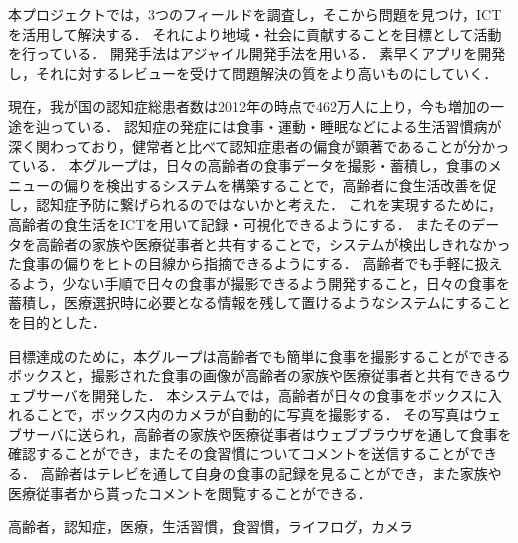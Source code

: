 \documentclass[../report]{subfiles}
\begin{document}
\begin{jabstract}
本プロジェクトでは，3つのフィールドを調査し，そこから問題を見つけ，ICTを活用して解決する．
それにより地域・社会に貢献することを目標として活動を行っている．
開発手法はアジャイル開発手法を用いる．
素早くアプリを開発し，それに対するレビューを受けて問題解決の質をより高いものにしていく．

現在，我が国の認知症総患者数は2012年の時点で462万人に上り，今も増加の一途を辿っている．
認知症の発症には食事・運動・睡眠などによる生活習慣病が深く関わっており，健常者と比べて認知症患者の偏食が顕著であることが分かっている．
本グループは，日々の高齢者の食事データを撮影・蓄積し，食事のメニューの偏りを検出するシステムを構築することで，高齢者に食生活改善を促し，認知症予防に繋げられるのではないかと考えた．
これを実現するために，高齢者の食生活をICTを用いて記録・可視化できるようにする．
またそのデータを高齢者の家族や医療従事者と共有することで，システムが検出しきれなかった食事の偏りをヒトの目線から指摘できるようにする．
高齢者でも手軽に扱えるよう，少ない手順で日々の食事が撮影できるよう開発すること，日々の食事を蓄積し，医療選択時に必要となる情報を残して置けるようなシステムにすることを目的とした．

目標達成のために，本グループは高齢者でも簡単に食事を撮影することができるボックスと，撮影された食事の画像が高齢者の家族や医療従事者と共有できるウェブサーバを開発した．
本システムでは，高齢者が日々の食事をボックスに入れることで，ボックス内のカメラが自動的に写真を撮影する．
その写真はウェブサーバに送られ，高齢者の家族や医療従事者はウェブブラウザを通して食事を確認することができ，またその食習慣についてコメントを送信することができる．
高齢者はテレビを通して自身の食事の記録を見ることができ，また家族や医療従事者から貰ったコメントを閲覧することができる．

\begin{jkeyword}
高齢者，認知症，医療，生活習慣，食習慣，ライフログ，カメラ
\end{jkeyword}
\end{jabstract}
\end{document}
